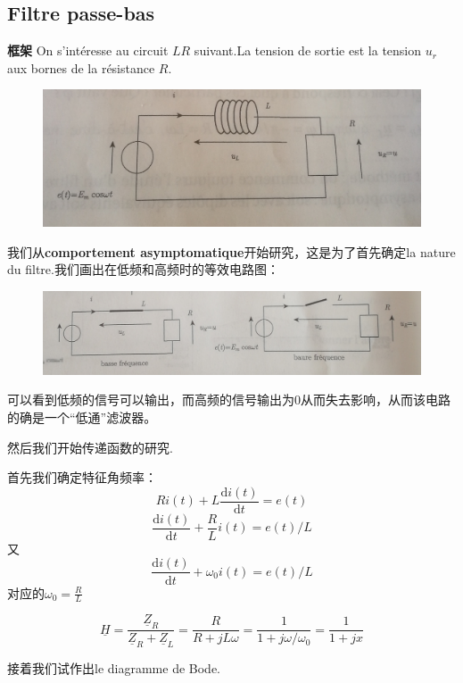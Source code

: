 \documentclass[12pt]{book}
\theoremstyle{definition}\newtheorem{dfn}{Définition}[chapter]
\theoremstyle{plain}\newtheorem{thm}{Théorème}[chapter]
\theoremstyle{plain}\newtheorem{prp}{Proposition}[chapter]
\theoremstyle{plain}\newtheorem{lem}{\bf Lemme}[chapter]
\theoremstyle{plain}\newtheorem{axm}{\bf Axiome}[chapter]
\theoremstyle{plain}\newtheorem{lmm}{\bf Lemme}[chapter]
\theoremstyle{plain}\newtheorem{cor}{\bf Corollaire}[chapter]
\theoremstyle{remark}\newtheorem{rem}{Remarque}[chapter]
\begin{document}
\subsection{Filtre passe-bas}
\begin{framed}{\textbf{框架}}
On s'intéresse au circuit $LR$ suivant.La tension de sortie est la tension $u_r$ aux bornes de la résistance $R$.
\end{framed}
\begin{figure}[H]
	\centering
	\includegraphics[scale=0.13]{image//Filtrage//2}
\end{figure}
我们从\textbf{comportement asymptomatique}开始研究，这是为了首先确定la nature du filtre.我们画出在低频和高频时的等效电路图：
\begin{figure}[H]
	\centering
	\includegraphics[scale=0.15]{image//Filtrage//3}
\end{figure}
可以看到低频的信号可以输出，而高频的信号输出为0从而失去影响，从而该电路的确是一个“低通”滤波器。

然后我们开始传递函数的研究.

首先我们确定特征角频率：
$$
Ri(t)+L\frac{\mathrm{d}i(t)}{\mathrm{d}t}=e(t)
$$
$$
\frac{\mathrm{d}i(t)}{\mathrm{d}t}+\frac{R}{L}i(t)=e(t)/L
$$
又
$$
\frac{\mathrm{d}i(t)}{\mathrm{d}t}+\omega_0i(t)=e(t)/L
$$
对应的$\omega_0=\frac{R}{L}$
\begin{framed}
	$$
	\underline{H}=\frac{\underline{Z}_R}{\underline{Z}_R+\underline{Z}_L}=\frac{R}{R+jL\omega}=\frac{1}{1+j\omega/\omega_0}=\frac{1}{1+jx}
	$$
\end{framed}

接着我们试作出le diagramme de Bode.
\end{document}
